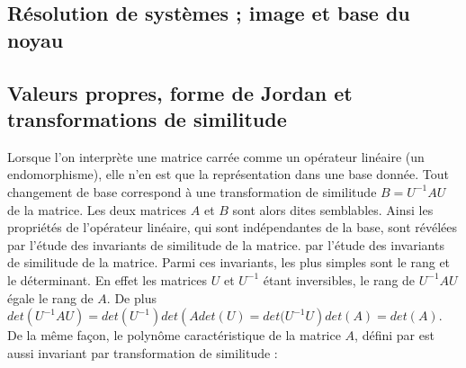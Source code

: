 \subsection{ Résolution de systèmes ; image et base du noyau}
\subsection{Valeurs propres, forme de Jordan et transformations de similitude}
Lorsque l’on interprète une matrice carrée comme un opérateur linéaire (un endomorphisme), elle n’en est que la représentation dans une base donnée. Tout changement de base correspond à une transformation de similitude 
$B = U^{-1}AU$ de la matrice. Les deux matrices $A$ et $B$ sont alors dites semblables. Ainsi les propriétés de l’opérateur linéaire, qui sont indépendantes de la base, sont révélées par l’étude des invariants de similitude de la matrice.
par l’étude des invariants de similitude de la matrice. Parmi ces invariants, les plus simples sont le rang et le déterminant. En effet les matrices $U$ et $U^{-1}$ étant inversibles, le rang de $U^{-1}AU$ égale le rang de $A$. De plus $det\left( U^{-1}AU\right)  = det\left( U^{-1}\right) det \left(A det(U) = det(U^{-1}U\right) det\left( A\right) = det\left(A\right)$. De
la même façon, le polynôme caractéristique de la matrice $A$, défini par 
 est aussi invariant par transformation de similitude :
%

